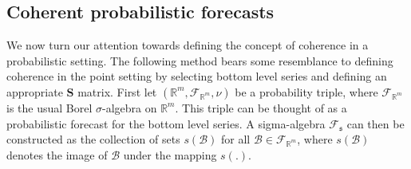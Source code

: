 \documentclass[12pt]{article}
\theoremstyle{definition}
\begin{document}
%


\subsection{Coherent probabilistic forecasts}\label{subsec:cohprobf}

We now turn our attention towards defining the concept of coherence in a probabilistic setting.  The following method bears some resemblance to defining coherence in the point setting by selecting bottom level series and defining an appropriate $\bm{S}$ matrix.  First let $(\mathbb{R}^m, \mathscr{F}_{\mathbb{R}^m}, \nu)$ be a probability triple, where $\mathscr{F}_{\mathbb{R}^m}$ is the usual Borel $\sigma$-algebra on $\mathbb{R}^m$. This triple can be thought of as a probabilistic forecast for the bottom level series.  A sigma-algebra $\mathscr{F}_{\mathfrak{s}}$ can then be constructed as the collection of sets $s(\mathcal{B})$ for all $\mathcal{B}\in \mathscr{F}_{\mathbb{R}^m}$, where $s(\mathcal{B})$ denotes the image of $\mathcal{B}$ under the mapping $s(.)$.
\end{document}
